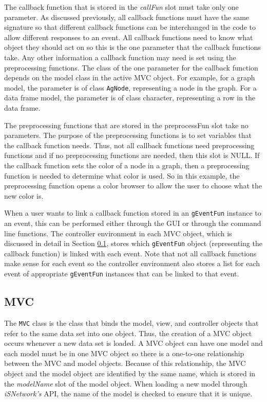 \documentclass{article}[11pt]
\newcommand{\Robject}[1]{{\texttt{#1}}}
\newcommand{\Rpackage}[1]{{\textit{#1}}}
\newcommand{\Rslot}[1]{\textsl{#1}}
\begin{document}
The callback function that is stored in the \Rslot{callFun} slot must take
only one parameter.  As discussed previously, all callback functions must have
the same signature so that different callback functions can be interchanged in
the code to allow different responses to an event.  All callback functions
need to know what object they should act on so this is the one
parameter that the callback functions take.  Any other information a callback
function may need is set using the preprocessing functions.  The class of
the one parameter for the callback function depends on the model class in
the active MVC object.  For example, for a graph model, the parameter is
of class \Robject{AgNode}, representing a node in the graph.  For a data frame
model, the parameter is of class character, representing a row in the
data frame. 

The preprocessing functions that are stored in the preprocessFun slot
take no parameters.  The purpose of the preprocessing functions is to set
variables that the callback function needs.  Thus, not all callback
functions need preprocessing functions and if no preprocessing functions
are needed, then this slot is NULL.  If the callback function sets the
color of a node in a graph, then a preprocessing function is needed to
determine what color is used.  So in this example, the preprocessing
function opens a color browser to allow the user to choose what the new
color is.

When a user wants to link a callback function stored in an \Robject{gEventFun}
instance to an event, this can be performed either through the GUI or through
the command line functions.  The controller environment in each MVC object,
which is discussed in detail in Section \ref{Ssec:OneMVC},
stores which \Robject{gEventFun} object (representing the callback
function) is linked with each event.  Note that not all callback functions
make sense for each event so the controller environment also stores a list
for each event of appropriate \Robject{gEventFun} instances that can be linked
to that event.

\subsection{MVC}\label{Ssec:OneMVC}
 
The \Robject{MVC} class is the class that binds the model, view, and
controller objects that refer to the same data set into one object.  Thus, the
creation of a MVC object occurs whenever a new data set is loaded.  A
MVC object can have one model and each model must be in one
MVC object so there is a one-to-one relationship between the
MVC and model objects.  Because of this relationship, the
MVC object and the model object are identified by the same name,
which is stored in the \Rslot{modelName} slot of the model object.  When
loading a new model through \Rpackage{iSNetwork's} API, the name of the model
is checked to ensure that it is unique.
\end{document}

